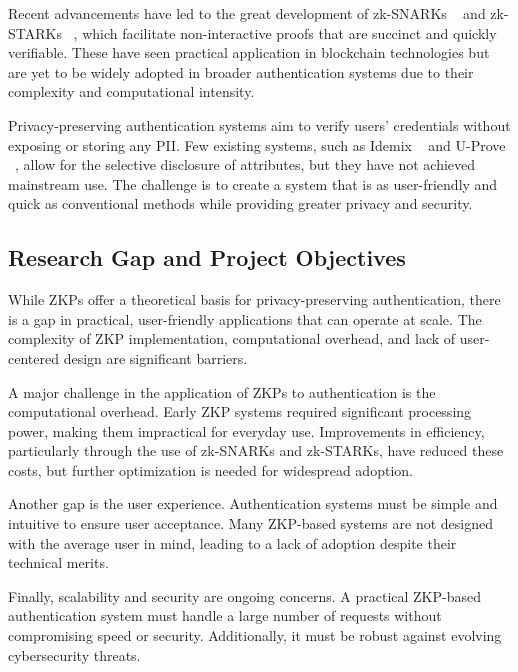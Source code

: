 Recent advancements have led to the great development of zk-SNARKs ~\cite{petkus2019zksnark,chen2023reviewzksnark} and zk-STARKs ~\cite{berentsen2022walkthroughzkstark,cryptoeprint2018zkstark}, which facilitate non-interactive proofs that are succinct and quickly verifiable. These have seen practical application in blockchain technologies but are yet to be widely adopted in broader authentication systems due to their complexity and computational intensity.

Privacy-preserving authentication systems aim to verify users' credentials without exposing or storing any PII. Few existing systems, such as Idemix ~\cite{camenisch2002idemix} and U-Prove ~\cite{paquin2011uprove1,paquin2011uprove2}, allow for the selective disclosure of attributes, but they have not achieved mainstream use. The challenge is to create a system that is as user-friendly and quick as conventional methods while providing greater privacy and security.

\subsection{Research Gap and Project Objectives}
\label{subsec:gap}

While ZKPs offer a theoretical basis for privacy-preserving authentication, there is a gap in practical, user-friendly applications that can operate at scale. The complexity of ZKP implementation, computational overhead, and lack of user-centered design are significant barriers.

A major challenge in the application of ZKPs to authentication is the computational overhead. Early ZKP systems required significant processing power, making them impractical for everyday use. Improvements in efficiency, particularly through the use of zk-SNARKs and zk-STARKs, have reduced these costs, but further optimization is needed for widespread adoption.

Another gap is the user experience. Authentication systems must be simple and intuitive to ensure user acceptance. Many ZKP-based systems are not designed with the average user in mind, leading to a lack of adoption despite their technical merits.

Finally, scalability and security are ongoing concerns. A practical ZKP-based authentication system must handle a large number of requests without compromising speed or security. Additionally, it must be robust against evolving cybersecurity threats.
